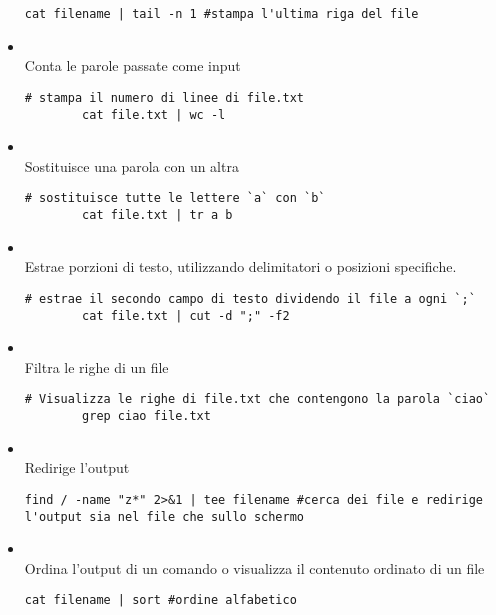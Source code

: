 \documentclass[../main.tex]{subfiles}
\begin{document}
\begin{itemize}
\begin{lstlisting}[style=bash]
        cat filename | tail -n 1 #stampa l'ultima riga del file
    \end{lstlisting}
    \item {} \\
    Conta le parole passate come input
    \begin{lstlisting}[style=bash]
        # stampa il numero di linee di file.txt
        cat file.txt | wc -l
    \end{lstlisting}
    \item {} \\
    Sostituisce una parola con un altra
    \begin{lstlisting}[style=bash]
        # sostituisce tutte le lettere `a` con `b`
        cat file.txt | tr a b
    \end{lstlisting}
    \item {} \\
    Estrae porzioni di testo, utilizzando delimitatori o posizioni specifiche.
    \begin{lstlisting}[style=bash]
        # estrae il secondo campo di testo dividendo il file a ogni `;`
        cat file.txt | cut -d ";" -f2
    \end{lstlisting}
    \item {} \\
    Filtra le righe di un file
    \begin{lstlisting}[style=bash]
        # Visualizza le righe di file.txt che contengono la parola `ciao`
        grep ciao file.txt
    \end{lstlisting}
    \item {} \\
    Redirige l'output
    \begin{lstlisting}[style=bash]
        find / -name "z*" 2>&1 | tee filename #cerca dei file e redirige l'output sia nel file che sullo schermo
    \end{lstlisting}
    \item {} \\
    Ordina l'output di un comando o visualizza il contenuto ordinato di un file
    \begin{lstlisting}[style=bash]
        cat filename | sort #ordine alfabetico


\end{lstlisting}
\end{itemize}
\end{document}
